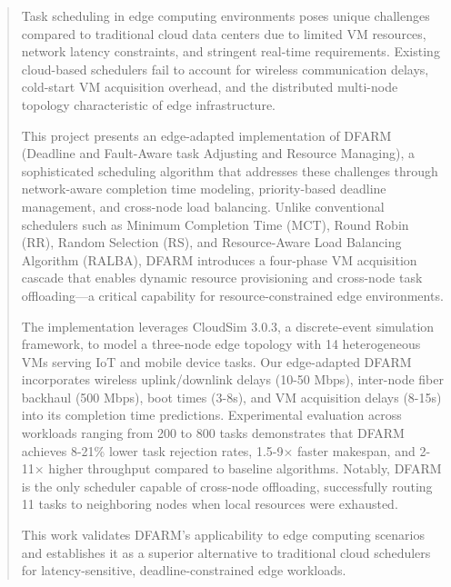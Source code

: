 \documentclass[12pt]{report}
\begin{document}
\thispagestyle{empty}


\newpage
{}

\begin{abstract}
Task scheduling in edge computing environments poses unique challenges compared to traditional cloud data centers due to limited VM resources, network latency constraints, and stringent real-time requirements. Existing cloud-based schedulers fail to account for wireless communication delays, cold-start VM acquisition overhead, and the distributed multi-node topology characteristic of edge infrastructure.

This project presents an edge-adapted implementation of DFARM (Deadline and Fault-Aware task Adjusting and Resource Managing), a sophisticated scheduling algorithm that addresses these challenges through network-aware completion time modeling, priority-based deadline management, and cross-node load balancing. Unlike conventional schedulers such as Minimum Completion Time (MCT), Round Robin (RR), Random Selection (RS), and Resource-Aware Load Balancing Algorithm (RALBA), DFARM introduces a four-phase VM acquisition cascade that enables dynamic resource provisioning and cross-node task offloading—a critical capability for resource-constrained edge environments.

The implementation leverages CloudSim 3.0.3, a discrete-event simulation framework, to model a three-node edge topology with 14 heterogeneous VMs serving IoT and mobile device tasks. Our edge-adapted DFARM incorporates wireless uplink/downlink delays (10-50 Mbps), inter-node fiber backhaul (500 Mbps), boot times (3-8s), and VM acquisition delays (8-15s) into its completion time predictions. Experimental evaluation across workloads ranging from 200 to 800 tasks demonstrates that DFARM achieves 8-21\% lower task rejection rates, 1.5-9× faster makespan, and 2-11× higher throughput compared to baseline algorithms. Notably, DFARM is the only scheduler capable of cross-node offloading, successfully routing 11 tasks to neighboring nodes when local resources were exhausted.

This work validates DFARM's applicability to edge computing scenarios and establishes it as a superior alternative to traditional cloud schedulers for latency-sensitive, deadline-constrained edge workloads.
\end{abstract}
\end{document}

